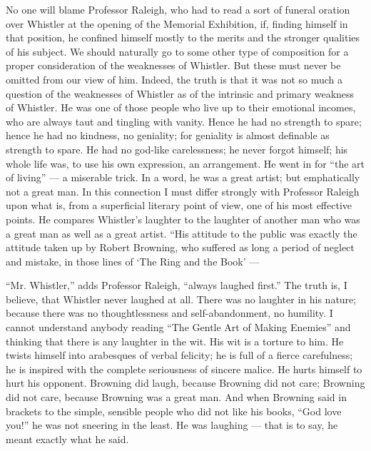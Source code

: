 No one will blame Professor Raleigh, who had to read a sort of funeral oration over Whistler at the opening of the Memorial Exhibition, if, finding himself in that position, he confined himself mostly to the merits and the stronger qualities of his subject. We should naturally go to some other type of composition for a proper consideration of the weaknesses of Whistler. But these must never be omitted from our view of him. Indeed, the truth is that it was not so much a question of the weaknesses of Whistler as of the intrinsic and primary weakness of Whistler. He was one of those people who live up to their emotional incomes, who are always taut and tingling with vanity. Hence he had no strength to spare; hence he had no kindness, no geniality; for geniality is almost definable as strength to spare. He had no god-like carelessness; he never forgot himself; his whole life was, to use his own expression, an arrangement. He went in for “the art of living” — a miserable trick. In a word, he was a great artist; but emphatically not a great man. In this connection I must differ strongly with Professor Raleigh upon what is, from a superficial literary point of view, one of his most effective points. He compares Whistler’s laughter to the laughter of another man who was a great man as well as a great artist. “His attitude to the public was exactly the attitude taken up by Robert Browning, who suffered as long a period of neglect and mistake, in those lines of `The Ring and the Book’ —

“Mr. Whistler,” adds Professor Raleigh, “always laughed first.” The truth is, I believe, that Whistler never laughed at all. There was no laughter in his nature; because there was no thoughtlessness and self-abandonment, no humility. I cannot understand anybody reading “The Gentle Art of Making Enemies” and thinking that there is any laughter in the wit. His wit is a torture to him. He twists himself into arabesques of verbal felicity; he is full of a fierce carefulness; he is inspired with the complete seriousness of sincere malice. He hurts himself to hurt his opponent. Browning did laugh, because Browning did not care; Browning did not care, because Browning was a great man. And when Browning said in brackets to the simple, sensible people who did not like his books, “God love you!” he was not sneering in the least. He was laughing — that is to say, he meant exactly what he said.


